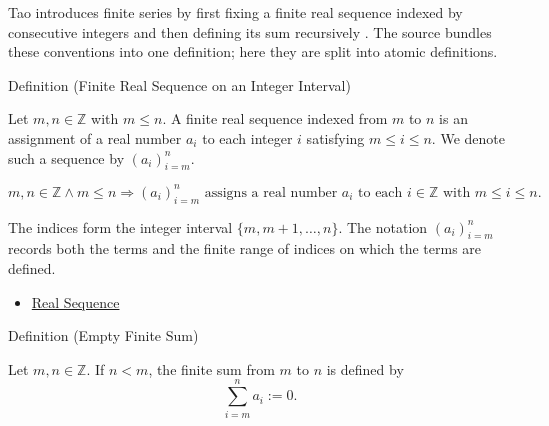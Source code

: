 \begin{remark*}[Exposition]
Tao introduces finite series by first fixing a finite real sequence indexed
by consecutive integers and then defining its sum recursively
\cite{TaoAnalysis1}. The source bundles these conventions into one
definition; here they are split into atomic definitions.
\end{remark*}

\begin{definitionbox}{Definition (Finite Real Sequence on an Integer Interval)}
\begin{definition}
\label{def:finite-real-sequence-integer-interval}

Let \(m,n \in \mathbb{Z}\) with \(m \le n\). A finite real sequence indexed
from \(m\) to \(n\) is an assignment of a real number \(a_i\) to each
integer \(i\) satisfying \(m \le i \le n\). We denote such a sequence by
\((a_i)_{i=m}^{n}\).
\end{definition}
\end{definitionbox}

\begin{remark*}
\[
  m,n\in\mathbb Z\wedge m\le n
  \Longrightarrow
  (a_i)_{i=m}^{n}\text{ assigns a real number }a_i
  \text{ to each }i\in\mathbb Z\text{ with }m\le i\le n.
\]
\end{remark*}

\begin{remark*}[Interpretation]
The indices form the integer interval \(\{m,m+1,\ldots,n\}\). The notation
\((a_i)_{i=m}^{n}\) records both the terms and the finite range of indices
on which the terms are defined.
\end{remark*}

\begin{dependencies}
\begin{itemize}
  \item \hyperref[def:real-sequence]{Real Sequence}
\end{itemize}
\end{dependencies}

\begin{definitionbox}{Definition (Empty Finite Sum)}
\begin{definition}
\label{def:empty-finite-sum}

Let \(m,n \in \mathbb{Z}\). If \(n < m\), the finite sum from \(m\) to
\(n\) is defined by
\[
  \sum_{i=m}^{n} a_i := 0.
\]
\end{definition}
\end{definitionbox}

